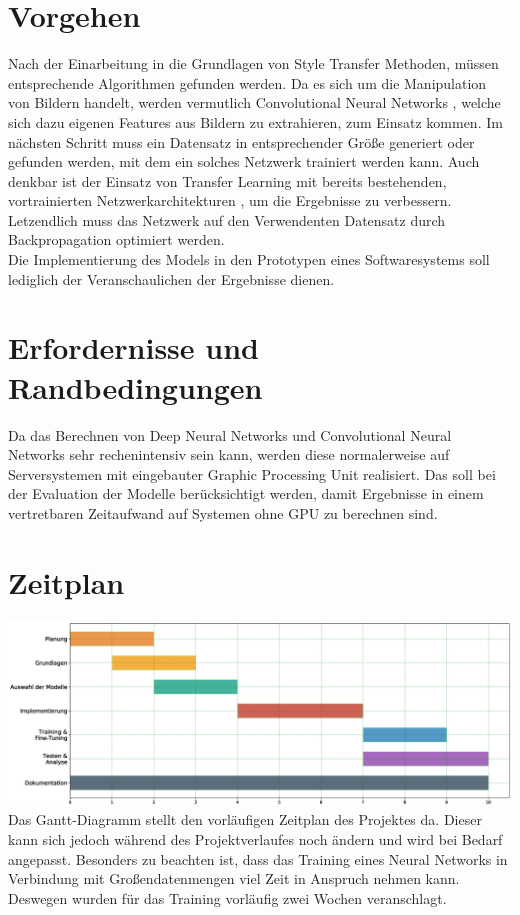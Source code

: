 \section{Vorgehen}
Nach der Einarbeitung in die Grundlagen von Style Transfer \cite{DBLP:journals/corr/GatysEB15a} Methoden, müssen entsprechende Algorithmen gefunden werden.
Da es sich um die Manipulation von Bildern handelt, werden vermutlich Convolutional Neural Networks \cite{lecun-gradientbased-learning-applied-1998}, welche sich dazu eigenen Features aus
Bildern zu extrahieren, zum Einsatz kommen.
Im nächsten Schritt muss ein Datensatz in entsprechender Größe generiert oder gefunden werden, mit dem ein solches Netzwerk trainiert werden
kann. Auch denkbar ist der Einsatz von Transfer Learning mit bereits bestehenden, 
vortrainierten Netzwerkarchitekturen \cite{DBLP:journals/corr/HeZRS15}, um die Ergebnisse zu verbessern.
Letzendlich muss das Netzwerk auf den Verwendenten Datensatz durch Backpropagation \cite{doi:10.1162/neco.1989.1.4.541} optimiert werden.
\\
Die Implementierung des Models in den Prototypen eines Softwaresystems soll lediglich der Veranschaulichen der Ergebnisse dienen.

\section{Erfordernisse und Randbedingungen}
Da das Berechnen von Deep Neural Networks und Convolutional Neural Networks sehr rechenintensiv sein kann,
werden diese normalerweise auf Serversystemen mit eingebauter Graphic Processing Unit realisiert. Das soll bei der Evaluation der 
Modelle berücksichtigt werden, damit Ergebnisse in einem vertretbaren Zeitaufwand auf Systemen ohne GPU zu berechnen sind.

\section{Zeitplan}
\includegraphics[width=1.00\textwidth]{resources/gantt.eps}
Das Gantt-Diagramm stellt den vorläufigen Zeitplan des Projektes da.
Dieser kann sich jedoch während des Projektverlaufes noch ändern und wird bei Bedarf angepasst.
Besonders zu beachten ist, dass das Training eines Neural Networks in Verbindung mit Großendatenmengen viel Zeit in Anspruch nehmen kann.
Deswegen wurden für das Training vorläufig zwei Wochen veranschlagt.

